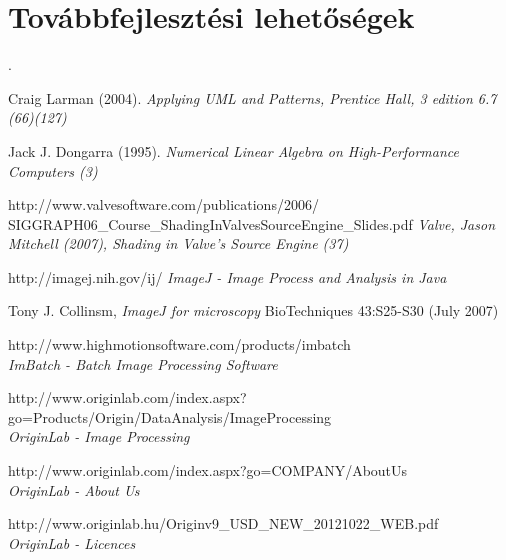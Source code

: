 \documentclass[a4paper,12pt,oneside]{report}
\begin{document}
\section{Továbbfejlesztési lehetőségek}
.
%
%

\begin{thebibliography}{99}

		Craig Larman (2004). 
        {\em Applying UML and Patterns, Prentice Hall, 3 edition 6.7 (66)(127)\\}

		Jack J. Dongarra (1995). 
        {\em Numerical Linear Algebra on High-Performance Computers (3)\\}
        
		http://www.valvesoftware.com/publications/2006/\\SIGGRAPH06\_Course\_ShadingInValvesSourceEngine\_Slides.pdf
        {\em Valve, Jason Mitchell (2007), Shading in Valve’s Source Engine  (37) \\}     
        
        

        http://imagej.nih.gov/ij/
        {\em ImageJ - Image Process and Analysis in Java}
        
		Tony J. Collinsm,
        {\em ImageJ for microscopy}
        BioTechniques 43:S25-S30 (July 2007)

        http://www.highmotionsoftware.com/products/imbatch\\
        {\em ImBatch - Batch Image Processing Software}

		http://www.originlab.com/index.aspx?go=Products/Origin/DataAnalysis/ImageProcessing\\
        {\em OriginLab - Image Processing}
        
        
        http://www.originlab.com/index.aspx?go=COMPANY/AboutUs\\
        {\em OriginLab - About Us}

		http://www.originlab.hu/Originv9\_USD\_NEW\_20121022\_WEB.pdf\\
        {\em OriginLab - Licences}
        

\end{thebibliography}
\end{document}
